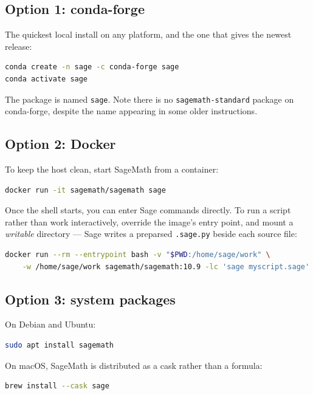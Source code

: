 \subsection{Option 1: conda-forge}
The quickest local install on any platform, and the one that gives the newest
release:

\begin{lstlisting}[language=bash]
conda create -n sage -c conda-forge sage
conda activate sage
\end{lstlisting}

The package is named \texttt{sage}. Note there is no \texttt{sagemath-standard}
package on conda-forge, despite the name appearing in some older instructions.

\subsection{Option 2: Docker}
To keep the host clean, start SageMath from a container:

\begin{lstlisting}[language=bash]
docker run -it sagemath/sagemath sage
\end{lstlisting}

Once the shell starts, you can enter Sage commands directly. To run a script
rather than work interactively, override the image's entry point, and mount a
\emph{writable} directory --- Sage writes a preparsed \texttt{.sage.py} beside
each source file:

\begin{lstlisting}[language=bash]
docker run --rm --entrypoint bash -v "$PWD:/home/sage/work" \
    -w /home/sage/work sagemath/sagemath:10.9 -lc 'sage myscript.sage'
\end{lstlisting}

\subsection{Option 3: system packages}
On Debian and Ubuntu:

\begin{lstlisting}[language=bash]
sudo apt install sagemath
\end{lstlisting}

On macOS, SageMath is distributed as a cask rather than a formula:

\begin{lstlisting}[language=bash]
brew install --cask sage
\end{lstlisting}

